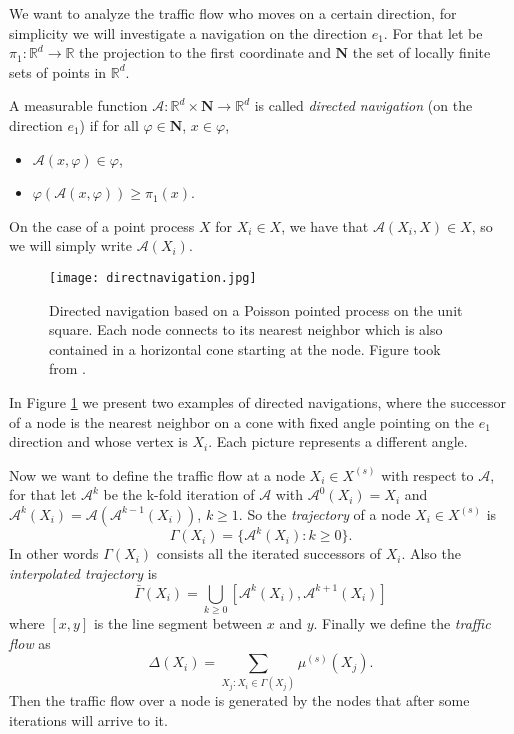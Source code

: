 We want to analyze the traffic flow who moves on a certain direction, for simplicity we will investigate a navigation on the direction $e_1$. For that let be $\pi_1:\mathbb{R}^d\rightarrow\mathbb{R}$ the projection to the first coordinate and $\textbf{N}$ the set of locally finite sets of points in $\mathbb{R}^d$.
\begin{defn} A measurable function $\mathcal{A}:\mathbb{R}^d\times\textbf{N}\rightarrow\mathbb{R}^d$ is called \textit{directed navigation} (on the direction $e_1$)  if for all $\varphi\in\textbf{N}$, $x\in\varphi$,
\begin{itemize}
\item $\mathcal{A}(x,\varphi)\in\varphi$, 
\item $\varphi(\mathcal{A}(x,\varphi))\geq \pi_1(x)$.
\end{itemize}
On the case of a point process $X$ for $X_{i}\in X$, we have that $\mathcal{A}(X_i, X)\in X$, so we will simply write $\mathcal{A}(X_i)$.
\end{defn}
\begin{figure}
\captionsetup{width=1\textwidth}
\centering
\texttt{[image: directnavigation.jpg]}
\caption{Directed navigation based on a Poisson pointed process on the unit square. Each node connects to its nearest neighbor which is also contained in a horizontal cone starting at the node. Figure took from \cite{WIAS}.}
\label{fig.2.1}
\end{figure}
In Figure \ref{fig.2.1} we present two examples of directed navigations, where the successor of a node is  the nearest neighbor on a cone with fixed angle pointing on the $e_1$ direction and whose vertex is $X_i$. Each picture represents a different angle.

Now we want to define the traffic flow at a node $X_i\in X^{(s)}$ with respect to $\mathcal{A}$, for that let $\mathcal{A}^k$ be the k-fold iteration of $\mathcal{A}$ with $\mathcal{A}^0(X_i)=X_i$ and $\mathcal{A}^k(X_i)=\mathcal{A}(\mathcal{A}^{k-1}(X_i))$, $k\geq 1$. So the \textit{trajectory} of a node $X_i\in X^{(s)}$ is $$\Gamma(X_i)=\lbrace \mathcal{A}^k(X_i):k\geq 0\rbrace. $$ In other words $\Gamma(X_i)$ consists all the iterated successors of $X_i$. 
Also the \textit{interpolated trajectory} is
$$\bar{\Gamma}(X_i)=\bigcup_{k\geq 0}[\mathcal{A}^{k}(X_i), \mathcal{A}^{k+1}(X_i)] $$ where $[x,y]$ is the line segment between $x$ and $y$. Finally we define the \textit{traffic flow} as $$\Delta(X_i)=\sum_{X_j: X_i\in\Gamma(X_j)}\mu^{(s)}(X_j). $$ Then the traffic flow over a node is generated by the nodes that after some iterations will arrive to it.

